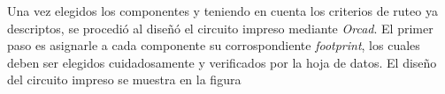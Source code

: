 Una vez elegidos los componentes y teniendo en cuenta los criterios de ruteo ya descriptos, se procedió al diseñó el circuito impreso mediante \textit{Orcad}. El primer paso es asignarle a cada componente su corrospondiente \textit{footprint}, los cuales deben ser elegidos cuidadosamente y verificados por la hoja de datos. El diseño del circuito impreso se muestra en la figura %

